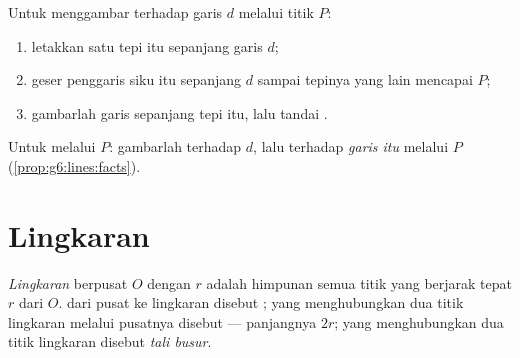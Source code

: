 \begin{method}\label{met:g6:lines:setsquare}
Untuk menggambar  terhadap garis $d$ melalui titik $P$:
\begin{enumerate}
  \item letakkan satu tepi  itu sepanjang garis $d$;
  \item geser penggaris siku itu sepanjang $d$ sampai tepinya yang
        lain mencapai $P$;
  \item gambarlah garis sepanjang tepi itu, lalu tandai .
\end{enumerate}
Untuk  melalui $P$: gambarlah  terhadap
$d$, lalu  terhadap \emph{garis itu} melalui $P$
(\cref{prop:g6:lines:facts}).
\end{method}

\section{Lingkaran}

\begin{definition}[Lingkaran]\label{def:g6:lines:circle}
\emph{Lingkaran} berpusat $O$ dengan  $r$
adalah himpunan semua titik yang berjarak tepat $r$ dari $O$.  dari pusat ke lingkaran disebut \emph{};  yang
menghubungkan dua titik lingkaran melalui pusatnya disebut
\emph{} --- panjangnya $2r$;  yang menghubungkan dua
titik lingkaran disebut \emph{tali busur}.
\end{definition}


